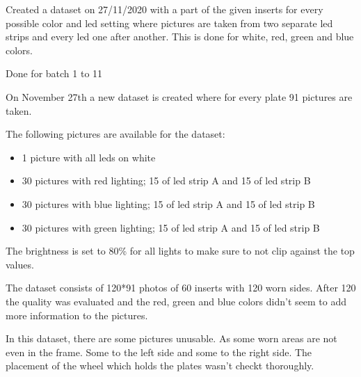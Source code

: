 Created a dataset on 27/11/2020 with a part of the given inserts for every possible color and led setting where pictures are taken from two separate led strips and every led one after another. This is done for white, red, green and blue colors. 

Done for batch 1 to 11

On November 27th a new dataset is created where for every plate 91 pictures are taken. 

The following pictures are available for the dataset:

\begin{itemize}
\item 1 picture with all leds on white
\item 30 pictures with red lighting; 15 of led strip A and 15 of led strip B
\item 30 pictures with blue lighting; 15 of led strip A and 15 of led strip B
\item 30 pictures with green lighting; 15 of led strip A and 15 of led strip B
\end{itemize}


The brightness is set to 80\% for all lights to make sure to not clip against the top values.

The dataset consists of 120*91 photos of 60 inserts with 120 worn sides. After 120 the quality was evaluated and the red, green and blue colors didn't seem to add more information to the pictures. 

In this dataset, there are some pictures unusable. As some worn areas are not even in the frame. Some to the left side and some to the right side. The placement of the wheel which holds the plates wasn't checkt thoroughly.

